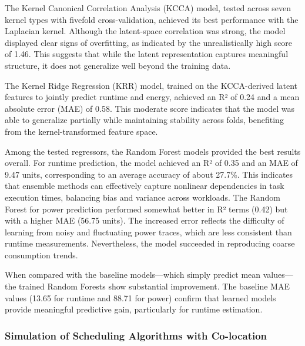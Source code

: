 The Kernel Canonical Correlation Analysis (KCCA) model, tested across seven kernel types with fivefold cross-validation, achieved its best performance with the Laplacian kernel. Although the latent-space correlation was strong, the model displayed clear signs of overfitting, as indicated by the unrealistically high score of 1.46. This suggests that while the latent representation captures meaningful structure, it does not generalize well beyond the training data.

The Kernel Ridge Regression (KRR) model, trained on the KCCA-derived latent features to jointly predict runtime and energy, achieved an R² of 0.24 and a mean absolute error (MAE) of 0.58. This moderate score indicates that the model was able to generalize partially while maintaining stability across folds, benefiting from the kernel-transformed feature space.

Among the tested regressors, the Random Forest models provided the best results overall. For runtime prediction, the model achieved an R² of 0.35 and an MAE of 9.47 units, corresponding to an average accuracy of about 27.7\%. This indicates that ensemble methods can effectively capture nonlinear dependencies in task execution times, balancing bias and variance across workloads. The Random Forest for power prediction performed somewhat better in R² terms (0.42) but with a higher MAE (56.75 units). The increased error reflects the difficulty of learning from noisy and fluctuating power traces, which are less consistent than runtime measurements. Nevertheless, the model succeeded in reproducing coarse consumption trends.

When compared with the baseline models—which simply predict mean values—the trained Random Forests show substantial improvement. The baseline MAE values (13.65 for runtime and 88.71 for power) confirm that learned models provide meaningful predictive gain, particularly for runtime estimation.

\subsubsection{Simulation of Scheduling Algorithms with Co-location}
\label{sec:workflow_makespan_and_energy_consumption}

